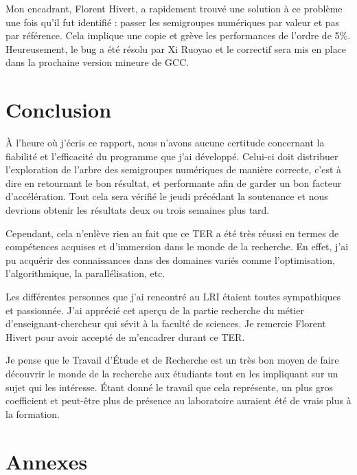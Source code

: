 \documentclass[12pt,a4paper]{report}
\begin{document}
Mon encadrant, Florent Hivert, a rapidement trouvé une solution à ce problème une fois qu'il fut identifié : passer les semigroupes numériques par valeur et pas par référence. Cela implique une copie et grève les performances de l'ordre de 5\%. Heureusement, le bug a été résolu par Xi Ruoyao et le correctif sera mis en place dans la prochaine version mineure de GCC.

\chapter*{Conclusion}

À l'heure où j'écris ce rapport, nous n'avons aucune certitude concernant la fiabilité et l'efficacité du programme que j'ai développé. Celui-ci doit distribuer l'exploration de l'arbre des semigroupes numériques de manière correcte, c'est à dire en retournant le bon résultat, et performante afin de garder un bon facteur d'accélération. Tout cela sera vérifié le jeudi précédant la soutenance et nous devrions obtenir les résultats deux ou trois semaines plus tard.

Cependant, cela n'enlève rien au fait que ce TER a été très réussi en termes de compétences acquises et d'immersion dans le monde de la recherche. En effet, j'ai pu acquérir des connaissances dans des domaines variés comme l'optimisation, l'algorithmique, la parallélisation, etc.

Les différentes personnes que j'ai rencontré au LRI étaient toutes sympathiques et passionnée. J'ai apprécié cet aperçu de la partie recherche du métier d'enseignant-chercheur qui sévit à la faculté de sciences. Je remercie Florent Hivert pour avoir accepté de m'encadrer durant ce TER.

Je pense que le Travail d'Étude et de Recherche est un très bon moyen de faire découvrir le monde de la recherche aux étudiants tout en les impliquant sur un sujet qui les intéresse. Étant donné le travail que cela représente, un plus gros coefficient et peut-être plus de présence au laboratoire auraient été de vrais plus à la formation.

\printbibliography
{}

\chapter*{Annexes}
\renewcommand{\thesection}{\Roman{section}}
\setcounter{section}{0}
\end{document}
